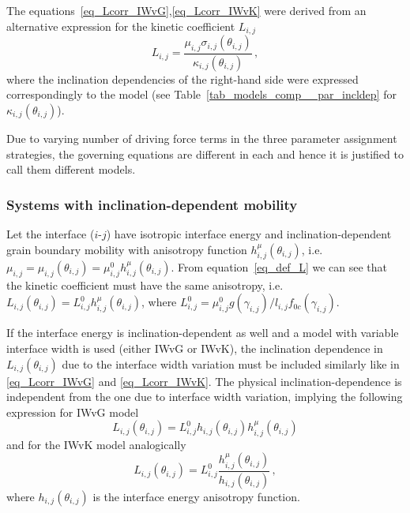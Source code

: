 		The equations~\eqref{eq_Lcorr_IWvG},\eqref{eq_Lcorr_IWvK} were derived from an alternative expression for the kinetic coefficient $L_{i,j}$
		\begin{equation}
			L_{i,j} = \frac{\mu_{i,j}\sigma_{i,j}(\theta_{i,j})}{\kappa_{i,j}(\theta_{i,j})} \,,
		\end{equation}
		where the inclination dependencies of the right-hand side were expressed correspondingly to the model (see Table~\ref{tab_models_comp__par_incldep} for $\kappa_{i,j}(\theta_{i,j})$).
		
		Due to varying number of driving force terms in the three parameter assignment strategies, the governing equations are different in each and hence it is justified to call them different models.

		\subsubsection{Systems with inclination-dependent mobility}
		Let the interface ($i$-$j$) have isotropic interface energy and inclination-dependent grain boundary mobility with anisotropy function $h_{i,j}^\mu(\theta_{i,j})$, i.e. $\mu_{i,j}=\mu_{i,j}(\theta_{i,j})=\mu_{i,j}^0h_{i,j}^\mu(\theta_{i,j})$. From equation~\eqref{eq_def_L} we can see that the kinetic coefficient must have the same anisotropy, i.e. $L_{i,j}(\theta_{i,j})=L_{i,j}^0h_{i,j}^\mu(\theta_{i,j})$, where $L_{i,j}^0=\mu_{i,j}^0g(\gamma_{i,j})/l_{i,j}f_{0c}(\gamma_{i,j})$. 
		
		If the interface energy is inclination-dependent as well and a model with variable interface width is used (either IWvG or IWvK), the inclination dependence in $L_{i,j}(\theta_{i,j})$ due to the interface width variation must be included similarly like in \eqref{eq_Lcorr_IWvG} and \eqref{eq_Lcorr_IWvK}. The physical inclination-dependence is independent from the one due to interface width variation, implying the following expression for IWvG model
		\begin{equation}     
			L_{i,j}(\theta_{i,j}) = L_{i,j}^0h_{i,j}(\theta_{i,j})h_{i,j}^\mu(\theta_{i,j})
		\end{equation}
		and for the IWvK model analogically
		\begin{equation}
			L_{i,j}(\theta_{i,j}) = L_{i,j}^0\frac{h_{i,j}^\mu(\theta_{i,j})}{h_{i,j}(\theta_{i,j})} \,,
		\end{equation}
		where $h_{i,j}(\theta_{i,j})$ is the interface energy anisotropy function.

